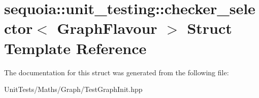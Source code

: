 \hypertarget{structsequoia_1_1unit__testing_1_1checker__selector}{}\section{sequoia\+::unit\+\_\+testing\+::checker\+\_\+selector$<$ Graph\+Flavour $>$ Struct Template Reference}
\label{structsequoia_1_1unit__testing_1_1checker__selector}


The documentation for this struct was generated from the following file\+:\begin{DoxyCompactItemize}
\item 
Unit\+Tests/\+Maths/\+Graph/Test\+Graph\+Init.\+hpp\end{DoxyCompactItemize}
